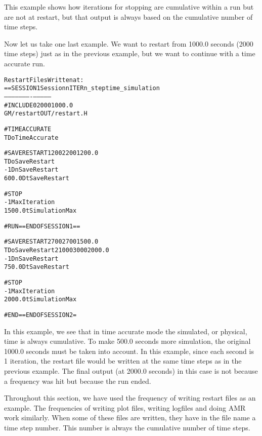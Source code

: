 This example shows how iterations for stopping are cumulative within a run but
are not at restart, but that output is always based on the cumulative number of time steps.

Now let us take one last example.  We want to restart from 1000.0 seconds (2000 time steps)
just as in the previous example, but we want to continue with a time accurate run.
\begin{alltt}
                                             Restart Files Written at:
==SESSION 1      \hfill        Session   nITER   n_step   time_simulation
                 \hfill        --------  ------  -------  --------------
#INCLUDE                         \hfill            0     2000           1000.0
GM/restartOUT/restart.H

#TIMEACCURATE
T            DoTimeAccurate  

#SAVERESTART                      \hfill  1       200     2200           1200.0
T            DoSaveRestart
-1           DnSaveRestart
600.0        DtSaveRestart

#STOP
-1           MaxIteration
1500.0       tSimulationMax

#RUN ==END OF SESSION 1== 

#SAVERESTART                      \hfill  2       700     2700           1500.0
T            DoSaveRestart	  \hfill  2      1000     3000           2000.0
-1           DnSaveRestart
750.0        DtSaveRestart

#STOP
-1           MaxIteration
2000.0       tSimulationMax

#END ==END OF SESSION 2 = 
                          
\end{alltt}
In this example, we see that in time accurate mode the simulated, or
physical, time is always cumulative.  To make 500.0 seconds more simulation,
the original 1000.0 seconds must be taken into account.  In this example,
since each second is 1 iteration, the restart file would be written at the
same time steps as in the previous example.  The final output (at 2000.0 seconds)
in this case
is not because a frequency was hit but because
the run ended.

Throughout this section, we have used the frequency of writing restart files
as an example.  The frequencies of writing plot files, writing logfiles and
doing AMR work similarly.
When some of these files are written, they have in the file name a time step
number.  This number is always the cumulative number of time steps.

%
